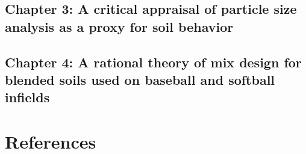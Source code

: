 \documentclass[
]{book}
\begin{document}
\hypertarget{chapter-3-a-critical-appraisal-of-particle-size-analysis-as-a-proxy-for-soil-behavior}{%
\section{Chapter 3: A critical appraisal of particle size analysis as a proxy for soil behavior}\label{chapter-3-a-critical-appraisal-of-particle-size-analysis-as-a-proxy-for-soil-behavior}}

\hypertarget{chapter-4-a-rational-theory-of-mix-design-for-blended-soils-used-on-baseball-and-softball-infields}{%
\section{Chapter 4: A rational theory of mix design for blended soils used on baseball and softball infields}\label{chapter-4-a-rational-theory-of-mix-design-for-blended-soils-used-on-baseball-and-softball-infields}}

\hypertarget{references}{%
\chapter{References}\label{references}}

  
\end{document}
